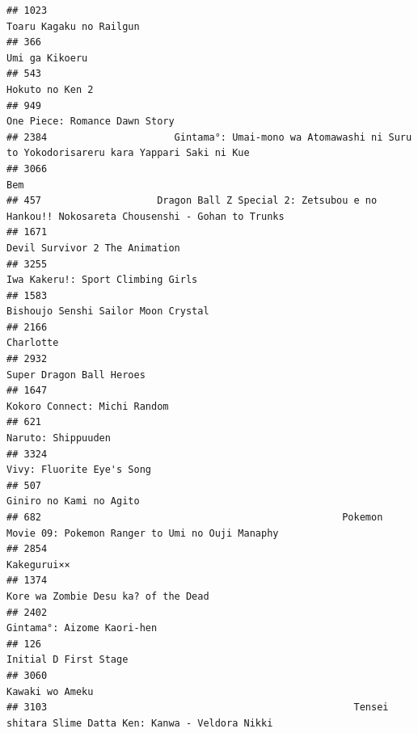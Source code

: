 \documentclass[
]{article}
\begin{document}
\begin{verbatim}
## 1023                                                                                   Toaru Kagaku no Railgun
## 366                                                                                             Umi ga Kikoeru
## 543                                                                                            Hokuto no Ken 2
## 949                                                                              One Piece: Romance Dawn Story
## 2384                      Gintama°: Umai-mono wa Atomawashi ni Suru to Yokodorisareru kara Yappari Saki ni Kue
## 3066                                                                                                       Bem
## 457                    Dragon Ball Z Special 2: Zetsubou e no Hankou!! Nokosareta Chousenshi - Gohan to Trunks
## 1671                                                                            Devil Survivor 2 The Animation
## 3255                                                                         Iwa Kakeru!: Sport Climbing Girls
## 1583                                                                       Bishoujo Senshi Sailor Moon Crystal
## 2166                                                                                                 Charlotte
## 2932                                                                                  Super Dragon Ball Heroes
## 1647                                                                              Kokoro Connect: Michi Random
## 621                                                                                         Naruto: Shippuuden
## 3324                                                                                 Vivy: Fluorite Eye's Song
## 507                                                                                    Giniro no Kami no Agito
## 682                                                    Pokemon Movie 09: Pokemon Ranger to Umi no Ouji Manaphy
## 2854                                                                                               Kakegurui××
## 1374                                                                       Kore wa Zombie Desu ka? of the Dead
## 2402                                                                                Gintama°: Aizome Kaori-hen
## 126                                                                                      Initial D First Stage
## 3060                                                                                           Kawaki wo Ameku
## 3103                                                     Tensei shitara Slime Datta Ken: Kanwa - Veldora Nikki

\end{verbatim}
\end{document}
